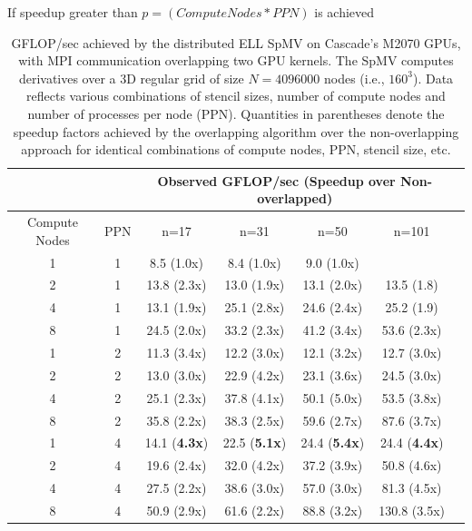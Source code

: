 \documentclass{report}
\begin{document}
If speedup greater than $p = (Compute Nodes * PPN)$ is achieved 

\begin{table}[h]
\centering
\caption{GFLOP/sec achieved by the distributed ELL SpMV on Cascade's M2070 GPUs, with MPI communication overlapping two GPU kernels. The SpMV computes derivatives over a 3D regular grid of size $N=4096000$ nodes (i.e., $160^3$). Data reflects various combinations of stencil sizes, number of compute nodes and number of processes per node (PPN). Quantities in parentheses denote the speedup factors achieved by the overlapping algorithm over the non-overlapping approach for identical combinations of compute nodes, PPN, stencil size, etc. }
\label{tbl:cascade_m2070_overlap}
\begin{tabular}{c|c|c|c|c|c|c}
 \multicolumn{2}{c}{ } & \multicolumn{4}{|c|}{Observed GFLOP/sec (Speedup over Non-overlapped)} \\  \hline
Compute Nodes   &   PPN  &   n=17   &   n=31   &   n=50   &   n=101   \\ \hline
1   &   1   &   8.5 (1.0x)   &   8.4 (1.0x)   &   9.0 (1.0x)   &      \\
2   &   1   &   13.8 (2.3x)   &   13.0 (1.9x)   &   13.1 (2.0x)   &   13.5 (1.8)   \\
4   &   1   &   13.1 (1.9x)   &   25.1 (2.8x)   &   24.6 (2.4x)   &   25.2 (1.9)   \\
8   &   1   &   24.5 (2.0x)   &   33.2 (2.3x)   &   41.2 (3.4x)   &   53.6 (2.3x)   \\ \hline
1   &   2   &   11.3 (3.4x)   &   12.2 (3.0x)   &   12.1 (3.2x)   &   12.7 (3.0x)   \\
2   &   2   &   13.0 (3.0x)   &   22.9 (4.2x)   &   23.1 (3.6x)   &   24.5 (3.0x)   \\
4   &   2   &   25.1 (2.3x)   &   37.8 (4.1x)   &   50.1 (5.0x)   &   53.5 (3.8x)   \\
8   &   2   &   35.8 (2.2x)   &   38.3 (2.5x)   &   59.6 (2.7x)   &   87.6 (3.7x)   \\ \hline
1   &   4   &   14.1 (\textbf{4.3x})   &   22.5 (\textbf{5.1x})   &   24.4 (\textbf{5.4x})   &   24.4 (\textbf{4.4x})   \\
2   &   4   &   19.6 (2.4x)   &   32.0 (4.2x)   &   37.2 (3.9x)   &   50.8 (4.6x)   \\
4   &   4   &   27.5 (2.2x)   &   38.6 (3.0x)   &   57.0 (3.0x)   &   81.3 (4.5x)   \\
8   &   4   &   50.9 (2.9x)   &   61.6 (2.2x)   &   88.8 (3.2x)   &   130.8 (3.5x)  
\end{tabular} 
\end{table}
\end{document}
